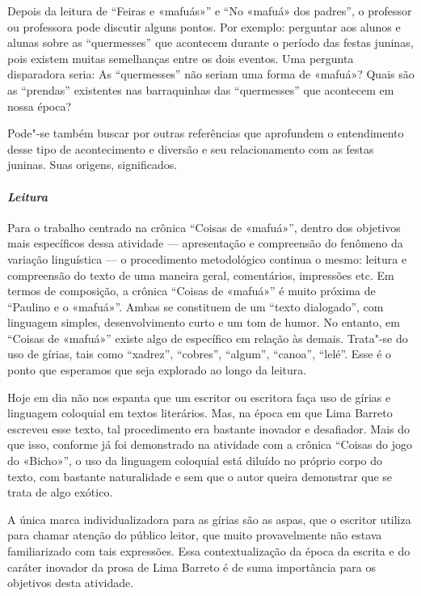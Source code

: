 \documentclass[11pt]{extarticle}
\begin{document}


Depois da leitura de ``Feiras e «mafuás»'' e
``No «mafuá» dos padres'', o professor ou professora pode
discutir alguns pontos. Por exemplo: perguntar aos alunos e alunas sobre
as ``quermesses'' que acontecem durante o período das festas juninas,
pois existem muitas semelhanças entre os dois eventos. Uma pergunta
disparadora seria: As ``quermesses'' não seriam uma forma de
«mafuá»? Quais são as ``prendas'' existentes nas barraquinhas
das ``quermesses'' que acontecem em nossa época?

Pode"-se também buscar por outras referências que aprofundem o
entendimento desse tipo de acontecimento e diversão e seu relacionamento
com as festas juninas. Suas origens, significados.


\paragraph{\textit{Leitura}}


Para o trabalho centrado na crônica ``Coisas de «mafuá»'',
dentro dos objetivos mais específicos dessa atividade --- apresentação e
compreensão do fenômeno da variação linguística --- o procedimento
metodológico continua o mesmo: leitura e compreensão do texto de uma
maneira geral, comentários, impressões etc. Em termos de composição, a
crônica ``Coisas de «mafuá»'' é muito próxima de
``Paulino e o «mafuá»''. Ambas se constituem de um ``texto
dialogado'', com linguagem simples, desenvolvimento curto e um tom de
humor. No entanto, em ``Coisas de «mafuá»'' existe algo de
específico em relação às demais. Trata"-se do uso de gírias, tais como
``xadrez'', ``cobres'', ``algum'', ``canoa'', ``lelé''. Esse é o ponto
que esperamos que seja explorado ao longo da leitura.

Hoje em dia não nos espanta que um escritor ou escritora faça uso de
gírias e linguagem coloquial em textos literários. Mas, na época em que
Lima Barreto escreveu esse texto, tal procedimento era bastante inovador
e desafiador. Mais do que isso, conforme já foi demonstrado na atividade
com a crônica ``Coisas do jogo do «Bicho»'', o uso da
linguagem coloquial está diluído no próprio corpo do texto, com bastante
naturalidade e sem que o autor queira demonstrar que se trata de algo
exótico.

A única marca individualizadora para as gírias são as aspas, que o
escritor utiliza para chamar atenção do público leitor, que muito
provavelmente não estava familiarizado com tais expressões. Essa
contextualização da época da escrita e do caráter inovador da prosa de
Lima Barreto é de suma importância para os objetivos desta atividade.
\end{document}
